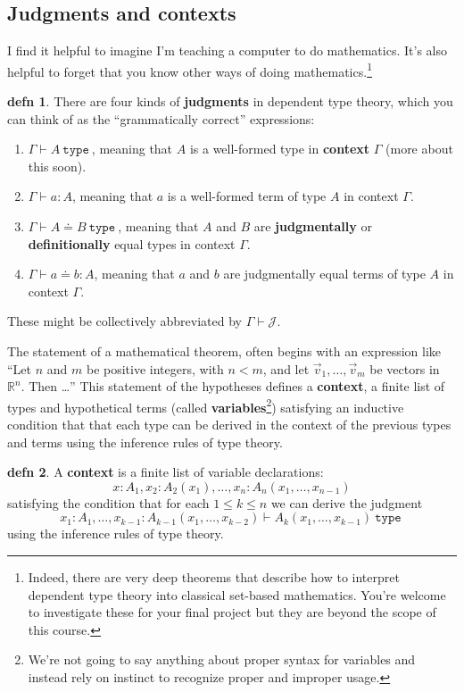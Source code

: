 \documentclass{amsart}
\theoremstyle{theorem}
\theoremstyle{definition}
\newtheorem*{defn}{defn}
\theoremstyle{remark}
\newcommand{\0}{\mathbbe{0}}
\newcommand{\1}{\mathbbe{1}}
\newcommand{\2}{\mathbbe{2}}
\newcommand{\3}{\mathbbe{3}}
\newcommand{\4}{\mathbbe{4}}
\newcommand{\RR}{\mathbb{R}}
\newcommand{\univ}{{~\texttt{type}~}}
\newcommand{\judgment}{\mathcal{J}}
\begin{document}
\subsection*{Judgments and contexts}

I find it helpful to imagine I'm teaching a computer to do mathematics. It's also helpful to forget that you know other ways of doing mathematics.\footnote{Indeed, there are very deep theorems that describe how to interpret dependent type theory into classical set-based mathematics. You're welcome to investigate these for your final project but they are beyond the scope of this course.}

\begin{defn} There are four kinds of \textbf{judgments} in dependent type theory, which you can think of as the ``grammatically correct'' expressions:
\begin{enumerate}
\item $\Gamma \vdash A \univ$, meaning that $A$ is a well-formed type in \textbf{context} $\Gamma$ (more about this soon).
\item $\Gamma \vdash a : A$, meaning that $a$ is a well-formed term of type $A$ in context $\Gamma$.
\item $\Gamma \vdash A \doteq B \univ$, meaning that $A$ and $B$ are \textbf{judgmentally} or \textbf{definitionally} equal types in context $\Gamma$.
\item $\Gamma \vdash a \doteq b : A$, meaning that $a$ and $b$ are judgmentally equal terms of type $A$ in context $\Gamma$.
\end{enumerate}
These might be collectively abbreviated by $\Gamma \vdash \judgment$.
\end{defn}

The statement of a mathematical theorem, often begins with an expression like ``Let $n$ and $m$ be positive integers, with $n < m$, and let $\vec{v}_1,\ldots, \vec{v}_m$ be vectors in $\RR^n$. Then \ldots'' This statement of the hypotheses defines a \textbf{context}, a finite list of types and hypothetical terms (called \textbf{variables}\footnote{We're not going to say anything about proper syntax for variables and instead rely on instinct to recognize proper and improper usage.}) satisfying an inductive condition that that each type can be derived in the context of the previous types and terms using the inference rules of type theory.

\begin{defn} A \textbf{context} is a finite list of variable declarations:
\[ x : A_1, x_2 : A_2(x_1), \ldots, x_n : A_n(x_1,\ldots, x_{n-1})\]
satisfying the condition that for each $1\leq k \leq n$ we can derive the judgment
\[ x_1 : A_1, \ldots, x_{k-1} : A_{k-1}(x_1,\ldots, x_{k-2}) \vdash A_k(x_1,\ldots, x_{k-1}) \univ\]
using the inference rules of type theory.
\end{defn}
\end{document}
